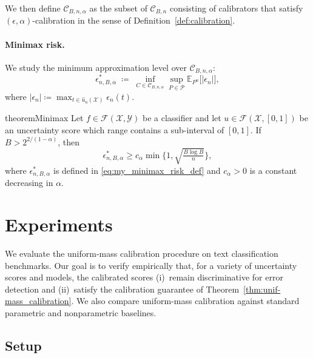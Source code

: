 \documentclass{article}
\theoremstyle{plain}
\theoremstyle{definition}
\theoremstyle{remark}
\begin{document}
We then define $\mathcal{C}_{B,n,\alpha}$ as the subset of $\mathcal{C}_{B,n}$ consisting of calibrators
that satisfy $(\epsilon,\alpha)$-calibration in the sense of Definition~\ref{def:calibration}.

\paragraph{Minimax risk.}
We study the minimum approximation level over $\mathcal{C}_{B,n,\alpha}$:
\begin{equation}
\label{eq:my_minimax_risk_def}
\epsilon^*_{n,B,\alpha}
\;\coloneqq\;
\inf_{C \in \mathcal{C}_{B,n,\alpha}}
\sup_{P\in\mathcal P}
\mathbb{E}_{P^n}\!\big[|\epsilon_n|\big],
\end{equation}
where $|\epsilon_n| \coloneqq \max_{t \in \widehat{u}_n(\mathcal{X})} \epsilon_n(t).$

\begin{restatable}[]{theorem}{Minimax}
\label{thm:minmax}
Let $f \in \mathcal{F}(\mathcal{X}, \mathcal{Y})$ be a classifier and let $u \in \mathcal{F}(\mathcal{X}, [0,1])$ be an uncertainty score which range contains a sub-interval of $[0,1]$. If $B>2^{2/(1-\alpha)}$, then
\[
\epsilon^*_{n,B,\alpha} \ge c_\alpha \min\Big\{1,\sqrt{\tfrac{B\log B}{n}}\Big\},
\]
where $\epsilon^*_{n,B,\alpha}$ is defined in \eqref{eq:my_minimax_risk_def} and $c_\alpha>0$ is a constant decreasing in $\alpha$.
\end{restatable}




\section{Experiments}
\label{sec:experiments}



We evaluate the uniform-mass calibration procedure on text classification benchmarks.
Our goal is to verify empirically that, for a variety of uncertainty scores and models, the calibrated scores (i)~remain discriminative for error detection and (ii)~satisfy the calibration guarantee of Theorem~\ref{thm:unif-mass_calibration}.
We also compare uniform-mass calibration against standard parametric and nonparametric baselines.

\subsection{Setup}
\end{document}
